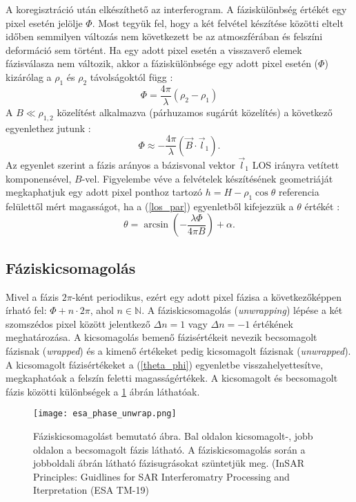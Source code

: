 \documentclass[12pt]{report}
\numberwithin{equation}{section}
\numberwithin{table}{section}
\numberwithin{figure}{section}
\begin{document}
A koregisztráció után elkészíthető az interferogram. A fáziskülönbség értékét egy pixel esetén jelölje $\Phi$. Most tegyük fel, hogy a két felvétel készítése közötti eltelt időben semmilyen változás nem következett be az atmoszférában és felszíni deformáció sem történt. Ha egy adott pixel esetén a visszaverő elemek fázisválasza nem változik, akkor a fáziskülönbsége egy adott pixel esetén ($\Phi$) kizárólag a $\rho_1$ és $\rho_2$ távolságoktól függ \cite{BurgmannInSAR}:
\begin{equation}\label{topo_phase}
    \Phi = \frac{4 \pi}{\lambda} (\rho_2 - \rho_1)
\end{equation}
A $B \ll \rho_{1,2}$ közelítést alkalmazva (párhuzamos sugárút közelítés) a következő egyenlethez jutunk \cite{ZebkerGoldstein1986}:
\begin{equation}\label{los_par}
    \Phi \approx - \frac{4 \pi}{\lambda} (\vec{B} \cdot \vec{l}_1 ).
\end{equation}
Az egyenlet szerint a fázis arányos a bázisvonal vektor $\vec{l}_1$ LOS irányra vetített komponensével, $B$-vel. Figyelembe véve a felvételek készítésének geometriáját megkaphatjuk egy adott pixel ponthoz tartozó $h = H - \rho_1 \cos\theta$ referencia felülettől mért magasságot, ha a (\ref{los_par}) egyenletből kifejezzük a $\theta$ értékét \cite{BurgmannInSAR}:
\begin{equation}\label{theta_phi}
    \theta = \arcsin \left(-\frac{\lambda\Phi}{4 \pi B}\right) + \alpha.
\end{equation}

\subsection{Fáziskicsomagolás}

Mivel a fázis $2\pi$-ként periodikus, ezért egy adott pixel fázisa a következőképpen írható fel: $\Phi + n \cdot 2\pi$, ahol $n \in \mathbb{N}$. A fáziskicsomagolás (\textit{unwrapping}) lépése a két szomszédos pixel között jelentkező $\Delta n = 1$ vagy $\Delta n = -1$ értékének meghatározása. A kicsomagolás bemenő fázisértékeit nevezik becsomagolt fázisnak (\textit{wrapped}) és a kimenő értékeket pedig kicsomagolt fázisnak (\textit{unwrapped}). A kicsomagolt fázisértékeket a (\ref{theta_phi}) egyenletbe visszahelyettesítve, megkaphatóak a felszín feletti magasságértékek. A kicsomagolt és becsomagolt fázis közötti különbségek a \ref{unwrapping} ábrán láthatóak.

\begin{figure}[H]
    \centering
    \texttt{[image: esa\_phase\_unwrap.png]}
    \caption{Fáziskicsomagolást bemutató ábra. Bal oldalon kicsomagolt-, jobb oldalon a becsomagolt fázis látható. A fáziskicsomagolás során a jobboldali ábrán látható fázisugrásokat szüntetjük meg. (InSAR Principles: Guidlines for SAR Interferomatry Processing and Iterpretation (ESA TM-19)}\label{unwrapping}
\end{figure}
\end{document}
